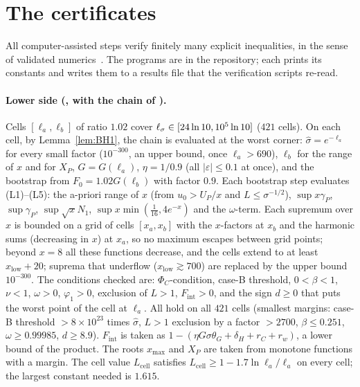 \section{The certificates}
\label{app:cert}

All computer-assisted steps verify finitely many explicit inequalities, in the sense of validated numerics~\cite{Moore1966,Tucker2011}. The programs are in the repository; each prints its constants and
writes them to a results file that the verification scripts re-read.

\paragraph*{Lower side (, with the chain of ).}
Cells $[\ell_a,\ell_b]$ of ratio $1.02$ cover $\ell_\sigma\in[24\ln10,10^5\ln10]$ ($421$ cells). On each cell, by Lemma~\ref{lem:BH1}, the chain is evaluated
at the worst corner: $\hat\sigma=e^{-\ell_a}$ for every small factor ($10^{-300}$, an upper bound, once $\ell_a>690$), $\ell_b$ for the range of $x$ and for
$X_P$, $G=G(\ell_a)$, $\eta=1/0.9$ (all $|\varepsilon|\le0.1$ at once), and the bootstrap from $F_0=1.02G(\ell_b)$ with factor $0.9$. Each bootstrap step
evaluates (L1)--(L5): the a-priori range of $x$ (from $u_0>U_P/x$ and $L\le\sigma^{-1/2}$), $\sup x\gamma_P$, $\sup\gamma_P$, $\sup\sqrt xN_1$,
$\sup x\min(\tfrac1{16},4e^{-x})$ and the $\omega$-term. Each supremum over $x$ is bounded on a grid of cells $[x_a,x_b]$ with the $x$-factors at $x_b$
and the harmonic sums (decreasing in $x$) at $x_a$, so no maximum escapes between grid points; beyond $x=8$ all these functions decrease, and the
cells extend to at least $x_{\mathrm{low}}+20$; suprema that underflow ($x_{\mathrm{low}}\gtrsim700$) are replaced by the upper bound $10^{-300}$.
The conditions checked are: $\Phi_C$-condition, case-B threshold, $0<\beta<1$, $\nu<1$, $\omega>0$, $\varphi_1>0$, exclusion of $L>1$,
$F_{\mathrm{int}}>0$, and the sign $d\ge0$ that puts the worst point of the cell at $\ell_a$. All hold on all $421$ cells (smallest margins: case-B
threshold $>8\times10^{23}$ times $\hat\sigma$, $L>1$ exclusion by a factor $>2700$, $\beta\le0.251$, $\omega\ge0.99985$, $d\ge8.9$). $F_{\mathrm{int}}$ is taken as
$1-(\eta G\sigma\theta_G+\delta_H+r_C+r_w)$, a lower bound of the product. The roots $x_{\max}$ and $X_P$ are taken from monotone functions with a margin.
The cell value $L_{\mathrm{cell}}$ satisfies $L_{\mathrm{cell}}\ge1-1.7\ln\ell_a/\ell_a$ on every cell; the largest constant needed is $1.615$.

